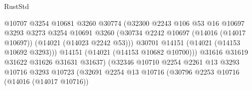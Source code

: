 \begin{lexlean}{RustStd}
\begin{coremodule}
                                            @10707
                                            @3254
                                            @10681
                                            @3260
                                            @30774
                                            (@32300
                                              @2243
                                              @106
                                              @53
                                              @16
                                              @10697
                                              @3293
                                              @3273
                                              @3254
                                              @10691
                                              @3260
                                              (@30734
                                                @2242
                                                @10697
                                                (@14016 (@14017 @10697))
                                                (@14021 (@14023 @2242 @53)))
                                              @30701
                                              @14151
                                              (@14021 (@14153 @10692 @3293)))
                                            @14151
                                            (@14021 (@14153 @10682 @10700)))
                                          @31616
                                          @31619
                                          @31622
                                          @31626
                                          @31631
                                          @31637)
                                        (@32346
                                          @10710
                                          @2254
                                          @2261
                                          @13
                                          @3293
                                          @10716
                                          @3293
                                          @10723
                                          (@32691
                                            @2254
                                            @13
                                            @10716
                                            (@30796
                                              @2253
                                              @10716
                                              (@14016 (@14017 @10716))

\end{coremodule}
\end{lexlean}
